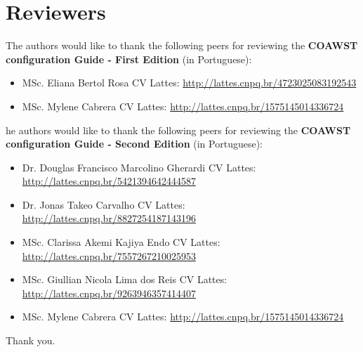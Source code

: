 \chapter*{Reviewers}

\bigskip
\noindent The authors would like to thank the following peers for reviewing the \textbf{COAWST configuration Guide - First Edition} (in Portuguese):
\bigskip

\begin{itemize}
    \item MSc. Eliana Bertol Rosa \newline CV Lattes: \textcolor{bleu_cite}{\href{http://lattes.cnpq.br/4723025083192543}{http://lattes.cnpq.br/4723025083192543}}
    \newline 
    \bigskip
    \item MSc. Mylene Cabrera \newline CV Lattes: \textcolor{bleu_cite}{\href{http://lattes.cnpq.br/1575145014336724}{http://lattes.cnpq.br/1575145014336724}}
\end{itemize}

\bigskip
\bigskip
\noindent he authors would like to thank the following peers for reviewing the \textbf{COAWST configuration Guide - Second Edition} (in Portuguese):
\bigskip

\begin{itemize}
    \item Dr. Douglas Francisco Marcolino Gherardi \newline CV Lattes: \textcolor{bleu_cite}{\href{http://lattes.cnpq.br/5421394642444587}{http://lattes.cnpq.br/5421394642444587}}
    \bigskip
    \item Dr. Jonas Takeo Carvalho \newline CV Lattes: \textcolor{bleu_cite}{\href{http://lattes.cnpq.br/8827254187143196}{http://lattes.cnpq.br/8827254187143196}}
    \bigskip
    \item MSc. Clarissa Akemi Kajiya Endo \newline CV Lattes: \textcolor{bleu_cite}{\href{http://lattes.cnpq.br/7557267210025953}{http://lattes.cnpq.br/7557267210025953}}
    \bigskip
    \item MSc. Giullian Nicola Lima dos Reis \newline CV Lattes: \textcolor{bleu_cite}{\href{http://lattes.cnpq.br/9263946357414407}{http://lattes.cnpq.br/9263946357414407}}
    \bigskip
    \item MSc. Mylene Cabrera \newline CV Lattes: \textcolor{bleu_cite}{\href{http://lattes.cnpq.br/1575145014336724}{http://lattes.cnpq.br/1575145014336724}}
\end{itemize}

\begin{flushright}
    Thank you. \\
\end{flushright}